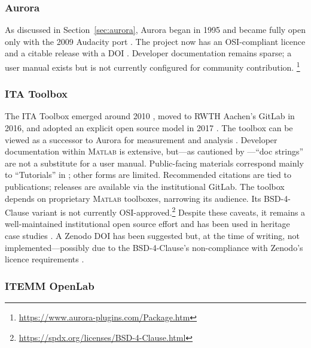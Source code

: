 \subsubsection{Aurora}

As discussed in Section~\ref{sec:aurora}, Aurora began in 1995 and became fully
open only with the 2009 Audacity port \cite{farina_new_2009}. The project now
has an OSI-compliant licence and a citable release with a DOI
\cite{farina_aurora_2025}. Developer documentation remains sparse; a user manual
exists but is not currently configured for community contribution.%
\footnote{\url{https://www.aurora-plugins.com/Package.htm}}

\subsubsection{ITA Toolbox}

The ITA Toolbox emerged around 2010 \cite{dietrich_matlab_2010}, moved to RWTH
Aachen’s GitLab in 2016, and adopted an explicit open source model in 2017
\cite{berzborn_ita_2017}. The toolbox can be viewed as a successor to Aurora for
measurement and analysis \cite{dietrich_influence_2013}. Developer documentation
within M\textsc{atlab} is extensive, but---as cautioned by
\textcite{stallman_gnu_1992}---``doc strings'' are not a substitute for a user
manual. Public-facing materials correspond mainly to ``Tutorials'' in
 \cite{procida_diataxis_2025}; other forms are
limited. Recommended citations are tied to publications; releases are available
via the institutional GitLab. The toolbox depends on proprietary M\textsc{atlab}
toolboxes, narrowing its audience. Its BSD-4-Clause variant is not currently
OSI-approved.\footnote{\url{https://spdx.org/licenses/BSD-4-Clause.html}}
Despite these caveats, it remains a well-maintained institutional open source
effort and has been used in heritage case studies
\cite{fagerlande_adequaccao_2020}. A Zenodo DOI has been suggested
\cite{berzborn_ita_2017} but, at the time of writing, not implemented---possibly
due to the BSD-4-Clause’s non-compliance with Zenodo’s licence requirements
\cite{zenodo_metadata_2025}.

\subsubsection{ITEMM OpenLab}

